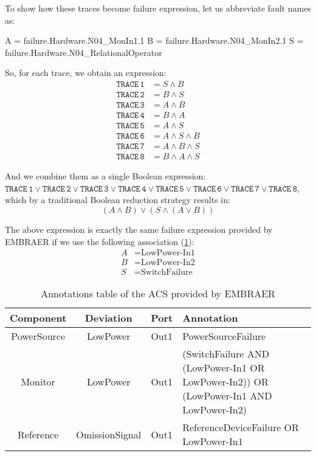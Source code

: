 \documentclass[12pt,openright,twoside,a4paper,oldfontcommands,english,brazil,draft]{abntex2}
\theoremstyle{theo}
\newcommand{\EMBRAER}{EMBRAER\xspace}
\newenvironment{snippetcspm}[1][2]
{
\ifthenelse{\equal{#1}{0}}
    {\tiny}
    {
    \ifthenelse{\equal{#1}{1}}
        {\scriptsize}
        {
        \ifthenelse{\equal{#1}{2}}
            {\footnotesize}
            {\small}
        }
    }
\verbatim
}
{
\endverbatim
}
\begin{document}
To show how these traces become failure expression, let us abbreviate fault names as:
%
\begin{snippetcspm}[2]
A = failure.Hardware.N04_MonIn1.1
B = failure.Hardware.N04_MonIn2.1
S = failure.Hardware.N04_RelationalOperator
\end{snippetcspm}
%
So, for each trace, we obtain an expression:
\begin{align*}
\mathtt{TRACE\,1} &= S \land B\\
\mathtt{TRACE\,2} &= B \land S\\
\mathtt{TRACE\,3} &= A \land B\\
\mathtt{TRACE\,4} &= B \land A\\
\mathtt{TRACE\,5} &= A \land S\\
\mathtt{TRACE\,6} &= A \land S \land B\\
\mathtt{TRACE\,7} &= A \land B \land S\\
\mathtt{TRACE\,8} &= B \land A \land S
\end{align*}

And we combine them as a single Boolean expression:
%
$\mathtt{TRACE\,1} \lor \mathtt{TRACE\,2} \lor \mathtt{TRACE\,3} \lor \mathtt{TRACE\,4} \lor \mathtt{TRACE\,5} \lor \mathtt{TRACE\,6} \lor \mathtt{TRACE\,7} \lor \mathtt{TRACE\,8}$, %
which by a traditional Boolean reduction strategy results in:
%
\[(A \land B) \lor (S \land (A \lor B))\]

\begin{sloppypar}
The above expression is exactly the same failure expression provided by \EMBRAER if we use the following association (\cref{tbl:acsAnnotations}):
\begin{align*}
A &= \text{LowPower-In1}\\
B &= \text{LowPower-In2}\\
S &= \text{SwitchFailure}
\end{align*}
\end{sloppypar}

\begin{table}[t]
\renewcommand{\arraystretch}{1.3}
\caption{Annotations table of the ACS provided by \EMBRAER}
\label{tbl:acsAnnotations}
\centering
\begin{tabularx}{\linewidth}{|c|c|c|X|}
\hline
\bfseries Component & \bfseries Deviation & \bfseries Port & \bfseries Annotation \\
\hline
PowerSource & LowPower & Out1 & PowerSourceFailure\\
\hline
Monitor & LowPower & Out1 & (SwitchFailure AND (LowPower-In1 OR LowPower-In2)) OR (LowPower-In1 AND LowPower-In2) \\
\hline
Reference & OmissionSignal & Out1 & ReferenceDeviceFailure OR LowPower-In1\\
\hline
\end{tabularx}
\end{table}
\end{document}
